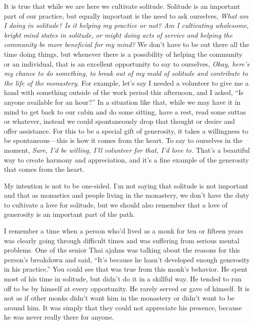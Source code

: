 It is true that while we are here we cultivate solitude. Solitude is an 
important part of our practice, but equally important is the need to 
ask ourselves, \emph{What am I doing in solitude? Is it helping my 
practice or not? Am I cultivating wholesome, bright mind states in 
solitude, or might doing acts of service and helping the community be 
more beneficial for my mind?} We don't have to be out there all the 
time doing things, but whenever there is a possibility of helping the 
community or an individual, that is an excellent opportunity to say to 
ourselves, \emph{Okay, here's my chance to do something, to break out 
of my mold of solitude and contribute to the life of the monastery.} 
For example, let's say I needed a volunteer to give me a hand with 
something outside of the work period this afternoon, and I asked, ``Is 
anyone available for an hour?'' In a situation like that, while we may 
have it in mind to get back to our cabin and do some sitting, have a 
rest, read some suttas or whatever, instead we could spontaneously drop 
that thought or desire and offer assistance. For this to be a special 
gift of generosity, it takes a willingness to be spontaneous---this is 
how it comes from the heart. To say to ourselves in the moment, 
\emph{Sure, I'd be willing, I'll volunteer for that, I'd love to.} 
That's a beautiful way to create harmony and appreciation, and it's a 
fine example of the generosity that comes from the heart.

My intention is not to be one-sided. I'm not saying that solitude is 
not important and that as monastics and people living in the monastery, 
we don't have the duty to cultivate a love for solitude, but we should 
also remember that a love of generosity is an important part of the 
path.

I remember a time when a person who'd lived as a monk for ten or 
fifteen years was clearly going through difficult times and was 
suffering from serious mental problems. One of the senior Thai ajahns 
was talking about the reasons for this person's breakdown and said, 
``It's because he hasn't developed enough generosity in his practice.'' 
You could see that was true from this monk's behavior. He spent most of 
his time in solitude, but didn't do it in a skillful way. He tended to 
run off to be by himself at every opportunity. He rarely served or gave 
of himself. It is not as if other monks didn't want him in the 
monastery or didn't want to be around him. It was simply that they 
could not appreciate his presence, because he was never really there 
for anyone.

